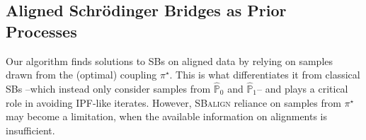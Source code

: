 \subsection{Aligned Schr\"odinger Bridges as Prior Processes}
\label{subsec:prior_drift}




Our algorithm finds solutions to SBs on aligned data by relying on samples drawn from the (optimal) coupling $\pi^\star$. This is what differentiates it from classical SBs --which instead only consider samples from $\hat{\mathbb{P}}_0$ and $\hat{\mathbb{P}}_1$-- and plays a critical role in avoiding IPF-like iterates. However, \textsc{SBalign} reliance on samples from $\pi^\star$ may become a limitation, when the available information on alignments is insufficient. 

